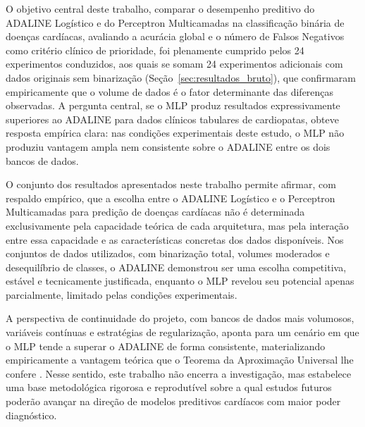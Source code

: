 O objetivo central deste trabalho, comparar o desempenho preditivo do ADALINE Logístico e do Perceptron Multicamadas na classificação binária de doenças cardíacas, avaliando a acurácia global e o número de Falsos Negativos como critério clínico de prioridade, foi plenamente cumprido pelos 24 experimentos conduzidos, aos quais se somam 24 experimentos adicionais com dados originais sem binarização (Seção~\ref{sec:resultados_bruto}), que confirmaram empiricamente que o volume de dados é o fator determinante das diferenças observadas. A pergunta central, se o MLP produz resultados expressivamente superiores ao ADALINE para dados clínicos tabulares de cardiopatas, obteve resposta empírica clara: nas condições experimentais deste estudo, o MLP não produziu vantagem ampla nem consistente sobre o ADALINE entre os dois bancos de dados.

O conjunto dos resultados apresentados neste trabalho permite afirmar, com respaldo empírico, que a escolha entre o ADALINE Logístico e o Perceptron Multicamadas para predição de doenças cardíacas não é determinada exclusivamente pela capacidade teórica de cada arquitetura, mas pela interação entre essa capacidade e as características concretas dos dados disponíveis. Nos conjuntos de dados utilizados, com binarização total, volumes moderados e desequilíbrio de classes, o ADALINE demonstrou ser uma escolha competitiva, estável e tecnicamente justificada, enquanto o MLP revelou seu potencial apenas parcialmente, limitado pelas condições experimentais.

A perspectiva de continuidade do projeto, com bancos de dados mais volumosos, variáveis contínuas e estratégias de regularização, aponta para um cenário em que o MLP tende a superar o ADALINE de forma consistente, materializando empiricamente a vantagem teórica que o Teorema da Aproximação Universal lhe confere \cite{braga2007}. Nesse sentido, este trabalho não encerra a investigação, mas estabelece uma base metodológica rigorosa e reprodutível sobre a qual estudos futuros poderão avançar na direção de modelos preditivos cardíacos com maior poder diagnóstico.

